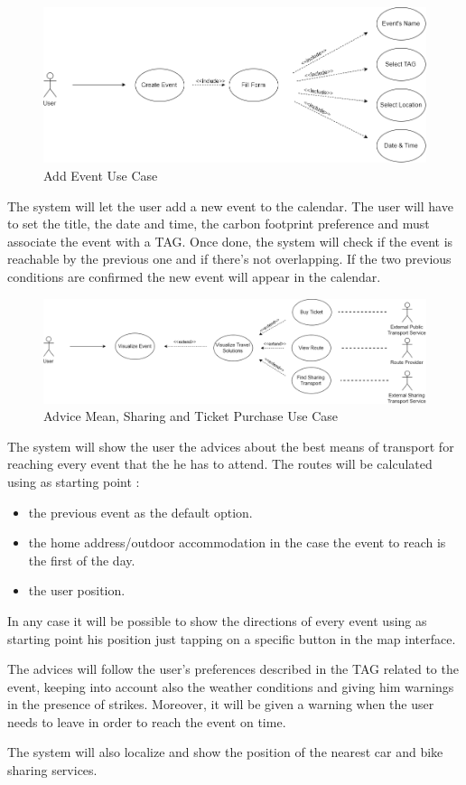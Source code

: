 \begin{figure}[H]
	\centering
	\includegraphics[scale=0.25]{Images/Use_Case/Add_Event}
	\caption{Add Event Use Case}
\end{figure}
The system will let the user add a new event to the calendar.  The user will have to set the title, the date and time, the carbon footprint preference and must associate the event with a TAG. 
Once done, the system will check if the event is reachable by the previous one and if there’s not overlapping. 
If the two previous conditions are confirmed the new event will appear in the calendar.

\begin{figure}[H]
	\centering
	\includegraphics[scale=0.25]{Images/Use_Case/Advice_Mean}
	\caption{Advice Mean, Sharing and Ticket Purchase Use Case}
\end{figure}
The system will show the user the advices about the best means of transport for reaching every event that the he has to attend. The routes will be calculated using as starting point :
\begin{itemize}
	\setlength{\leftskip}{1cm}
	\item the previous event as the default option.
	\item the home address/outdoor accommodation in the case the event to reach is the first of the day.
	\item the user position.
\end{itemize}\par
In any case it will be possible to show the directions of every event using as starting point his position just tapping on a specific button in the map interface.\par
The advices will follow the user’s preferences described in the TAG related to the event, keeping into account also the weather conditions and giving him warnings in the presence of strikes. Moreover, it will be given a warning when the user needs to leave in order to reach the event on time.\par
The system will also localize and show the position of the nearest car and bike sharing services.

